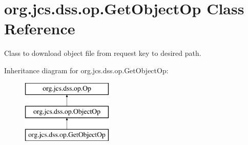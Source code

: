 \hypertarget{classorg_1_1jcs_1_1dss_1_1op_1_1GetObjectOp}{}\section{org.\+jcs.\+dss.\+op.\+Get\+Object\+Op Class Reference}
\label{classorg_1_1jcs_1_1dss_1_1op_1_1GetObjectOp}


Class to download object file from request key to desired path.  


Inheritance diagram for org.\+jcs.\+dss.\+op.\+Get\+Object\+Op\+:\begin{figure}[H]
\begin{center}
\leavevmode
\includegraphics[height=3.000000cm]{classorg_1_1jcs_1_1dss_1_1op_1_1GetObjectOp}
\end{center}
\end{figure}
